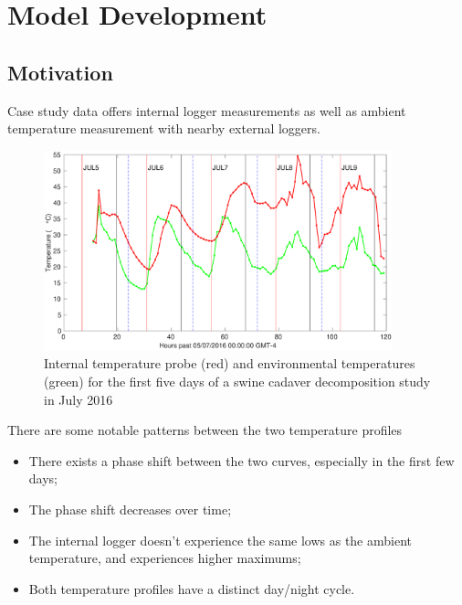 \documentclass{beamer}
\begin{document}
\section{Model Development}
\subsection{Motivation}
\begin{frame}
  Case study data offers internal logger measurements as well as
  ambient temperature measurement with nearby external loggers.
  \begin{figure}
    \includegraphics[width=0.9\textwidth]{Figures/jul1}
    \caption{Internal temperature probe (red) and environmental
      temperatures (green) for the first five days of a swine cadaver
      decomposition study in July 2016}

  \end{figure}

\end{frame}
\begin{frame}
  There are some notable patterns between the two temperature profiles
  \begin{itemize}
    \item There exists a phase shift between the two curves, especially
in the first few days;
\item The phase shift decreases over time;
\item The internal logger doesn't experience the same lows as
the ambient temperature, and experiences higher maximums;
\item Both temperature profiles have a distinct day/night cycle.

  \end{itemize}

\end{frame}
\end{document}
